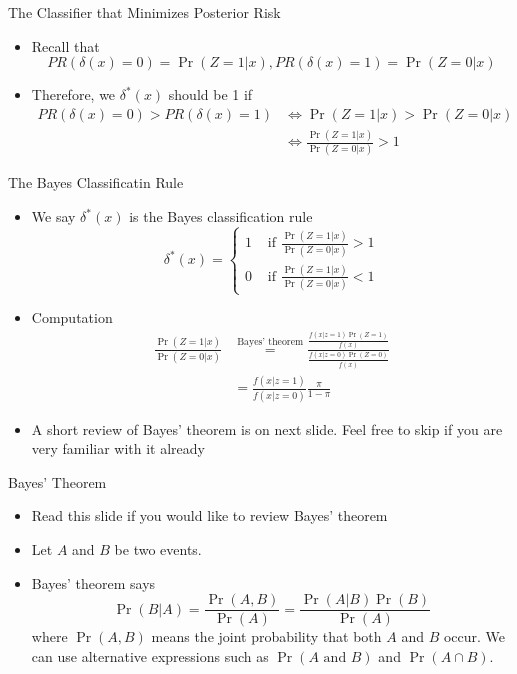\documentclass[
  ignorenonframetext,
]{beamer}
\providecommand{\tightlist}{%
  \setlength{\itemsep}{0pt}\setlength{\parskip}{0pt}}
\begin{document}
\begin{frame}{The Classifier that Minimizes Posterior Risk}
\protect\hypertarget{the-classifier-that-minimizes-posterior-risk}{}
\begin{itemize}
\tightlist
\item
  Recall that \[PR(\delta(x)=0)=\Pr(Z=1|x), PR(\delta(x)=1)=\Pr(Z=0|x)\]
\item
  Therefore, we \(\delta^*(x)\) should be 1 if \[\begin{aligned}
  PR(\delta(x)=0)>PR(\delta(x)=1) &\Leftrightarrow \Pr(Z=1|x)> \Pr(Z=0|x)\\
  &\Leftrightarrow \frac{\Pr(Z=1|x)}{\Pr(Z=0|x)}>1
  \end{aligned}\]
\end{itemize}
\end{frame}

\begin{frame}{The Bayes Classificatin Rule}
\protect\hypertarget{the-bayes-classificatin-rule}{}
\begin{itemize}
\item
  We say \(\delta^*(x)\) is the Bayes classification rule
  \[\delta^*(x)=\left\{
  \begin{array}{cc}
  1 & \mbox{ if } \frac{\Pr(Z=1|x)}{\Pr(Z=0|x)}>1\\
  0 & \mbox{ if } \frac{\Pr(Z=1|x)}{\Pr(Z=0|x)}<1
  \end{array}\right.\]
\item
  Computation \[\begin{aligned}
  \frac{\Pr(Z=1|x)}{\Pr(Z=0|x)} &
   \overset{\mbox{Bayes' theorem}} = \frac{\frac{f(x|z=1)\Pr(Z=1)}{f(x)}}{\frac{f(x|z=0)\Pr(Z=0)}{f(x)}}\\
  & = \frac{f(x|z=1)}{f(x|z=0)}\frac{\pi}{1-\pi}
  \end{aligned}\]
\item
  A short review of Bayes' theorem is on next slide. Feel free to skip
  if you are very familiar with it already
\end{itemize}
\end{frame}

\begin{frame}{Bayes' Theorem}
\protect\hypertarget{bayes-theorem}{}
\begin{itemize}
\tightlist
\item
  Read this slide if you would like to review Bayes' theorem
\item
  Let \(A\) and \(B\) be two events.
\item
  Bayes' theorem says
  \[\Pr(B|A) = \dfrac{\Pr(A,  B)}{\Pr(A)}=\dfrac{\Pr(A|B)\Pr(B)}{\Pr(A)}\]
  where \(\Pr(A,B)\) means the joint probability that both \(A\) and
  \(B\) occur. We can use alternative expressions such as
  \(\Pr(A \text{ and } B)\) and \(\Pr(A \cap B)\).
\end{itemize}
\end{frame}
\end{document}
